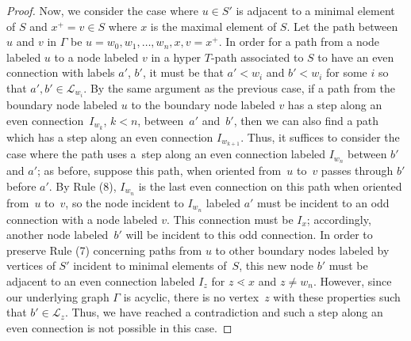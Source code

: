 \documentclass[pdftex]{sigma}
\numberwithin{equation}{section}
\newcommand{\new}[1]{{#1}}
\begin{document}
\begin{proof}
Now, we consider the case where $u \in S'$ is adjacent to a minimal element of $S$ and $x^+ = v \in S$ where $x$ is the maximal element of $S$. Let the path between $u$ and $v$ in $\Gamma$ be $u = w_0, w_1,\ldots, w_n, x, v = x^+$. In order for a path from a node labeled $u$ to a node labeled $v$ in a hyper $T$-path associated to $S$ to have an even connection with labels $a'$, $b'$, it must be that $a' < w_i$ and $b' < w_i$ for some $i$ so that $a',b' \in \mathcal{L}_{w_i}$. By the same argument as the previous case, if a path from the boundary node labeled $u$ to the boundary node labeled $v$ has a step along an even connection~$I_{w_k}$, $k < n$, between~$a'$ and~$b'$, then we can also find a path which has a step along an even connection $I_{w_{k+1}}$. Thus, it suffices to consider the case where the path uses a~step along an even connection labeled $I_{w_n}$ between $b'$ and $a'$; as before, suppose this path, when oriented from~$u$ to~$v$ passes through $b'$ before $a'$. By Rule (8), $I_{w_n}$ is the last even connection on this path when oriented from~$u$ to~$v$, so the node incident to \new{$I_{w_n}$} labeled $a'$ must be incident to an odd connection with a node labeled $v$. This connection must be $I_x$; accordingly, another node labeled~$b'$ will be incident to this odd connection. In order to preserve Rule (7) concerning paths from $u$ to other boundary nodes labeled by vertices of $S'$ incident to minimal elements of~$S$, this new node $b'$ must be adjacent to an even connection labeled $I_z$ for $z \lessdot x$ and $z \neq w_{n}$. However, since our underlying graph $\Gamma$ is acyclic, there is no vertex~$z$ with these properties such that $b' \in \mathcal{L}_z$. Thus, we have reached a contradiction and such a step along an even connection is not possible in this case.
\end{proof}
\end{document}
